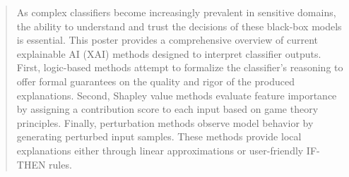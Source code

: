 \documentclass[a0,landscape]{a0poster}
\begin{document}
\begin{multicols}{4} %


\color{Navy} %

\begin{abstract}

    As complex classifiers become increasingly prevalent in sensitive domains, the ability to understand and 
    trust the decisions of these black-box models is essential. 
    This poster provides a comprehensive overview of current explainable AI (XAI) methods designed 
    to interpret classifier outputs. 
    First, logic-based methods attempt to formalize the classifier's reasoning to offer formal 
    guarantees on the quality and rigor of the produced explanations. Second, Shapley value 
    methods evaluate feature importance by assigning a contribution score to each input based on 
    game theory principles. Finally, perturbation methods observe model behavior by generating 
    perturbed input samples. These methods provide local explanations either through 
    linear approximations or user-friendly IF-THEN rules. 

\end{abstract}





\color{DarkSlateGray}

\fontsize{28pt}{32pt}\selectfont


\end{multicols}
\end{document}
